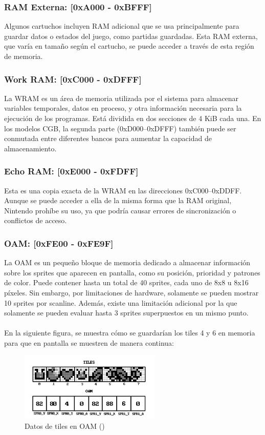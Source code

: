 \subsubsection{RAM Externa: [0xA000 - 0xBFFF]}
Algunos cartuchos incluyen RAM adicional que se usa principalmente para guardar datos o estados del juego, como partidas guardadas. Esta RAM externa, que varía en tamaño según el cartucho, se puede acceder a través de esta región de memoria.

\clearpage

\subsubsection{Work RAM: [0xC000 - 0xDFFF]}
La WRAM es un área de memoria utilizada por el sistema para almacenar variables temporales, datos en proceso, y otra información necesaria para la ejecución de los programas. Está dividida en dos secciones de 4 KiB cada una. En los modelos CGB, la segunda parte (0xD000–0xDFFF) también puede ser conmutada entre diferentes bancos para aumentar la capacidad de almacenamiento.

\subsubsection{Echo RAM: [0xE000 - 0xFDFF]}
Esta es una copia exacta de la WRAM en las direcciones 0xC000–0xDDFF. Aunque se puede acceder a ella de la misma forma que la RAM original, Nintendo prohíbe su uso, ya que podría causar errores de sincronización o conflictos de acceso.

\subsubsection{OAM: [0xFE00 - 0xFE9F]}\label{mem:oam}
La OAM es un pequeño bloque de memoria dedicado a almacenar información sobre los sprites que aparecen en pantalla, como su posición, prioridad y patrones de color. Puede contener hasta un total de 40 sprites, cada uno de 8x8 u 8x16 píxeles. Sin embargo, por limitaciones de hardware, solamente se pueden mostrar 10 sprites por scanline. Además, existe una limitación adicional por la que solamente se pueden evaluar hasta 3 sprites superpuestos en un mismo punto.
\\\\
En la siguiente figura, se muestra cómo se guardarían los tiles 4 y 6 en memoria para que en pantalla se muestren de manera continua:

\begin{figure}[H]
    \centering
    \includegraphics[width=0.6\textwidth]{include/images/oam_tiles.png}
    \caption{Datos de tiles en OAM (\cite{goldensacra})}
    \label{figure:oam_tiles}
\end{figure}

